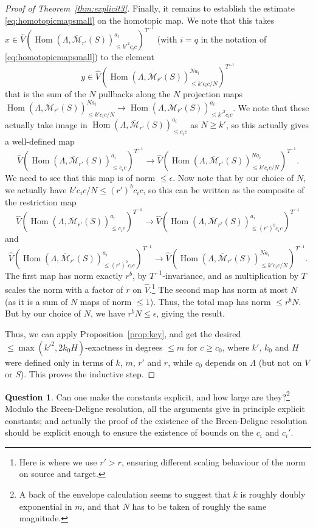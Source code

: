 \documentclass[11pt]{amsart}
\DeclareMathOperator{\Hom}{Hom}
\numberwithin{equation}{section}
\numberwithin{theorem}{section}
\theoremstyle{definition}
\newtheorem{question}[theorem]{Question}
\begin{document}
\begin{proof}[Proof of Theorem~\ref{thm:explicit3}]
Finally, it remains to establish the estimate \eqref{eq:homotopicmapsmall} on the homotopic map. We note that this takes $x\in \widehat{V}(\Hom(\Lambda,\overline{\mathcal M}_{r'}(S))_{\leq k'^2c_ic}^{a_i})^{T^{-1}}$ (with $i=q$ in the notation of \eqref{eq:homotopicmapsmall}) to the element
\[
y\in \widehat{V}(\Hom(\Lambda,\overline{\mathcal M}_{r'}(S))_{\leq k'c_ic/N}^{Na_i})^{T^{-1}}
\]
that is the sum of the $N$ pullbacks along the $N$ projection maps $\Hom(\Lambda,\overline{\mathcal M}_{r'}(S))_{\leq k'c_ic/N}^{Na_i}\to \Hom(\Lambda,\overline{\mathcal M}_{r'}(S))_{\leq k'^2c_ic}^{a_i}$. We note that these actually take image in $\Hom(\Lambda,\overline{\mathcal M}_{r'}(S))_{\leq c_ic}^{a_i}$ as $N\geq k'$, so this actually gives a well-defined map
\[
\widehat{V}(\Hom(\Lambda,\overline{\mathcal M}_{r'}(S))_{\leq c_ic}^{a_i})^{T^{-1}}\to \widehat{V}(\Hom(\Lambda,\overline{\mathcal M}_{r'}(S))_{\leq k'c_ic/N}^{Na_i})^{T^{-1}}.
\]
We need to see that this map is of norm $\leq \epsilon$. Now note that by our choice of $N$, we actually have $k'c_ic/N\leq (r')^b c_ic$, so this can be written as the composite of the restriction map
\[
\widehat{V}(\Hom(\Lambda,\overline{\mathcal M}_{r'}(S))_{\leq c_ic}^{a_i})^{T^{-1}}\to \widehat{V}(\Hom(\Lambda,\overline{\mathcal M}_{r'}(S))_{\leq (r')^b c_ic}^{a_i})^{T^{-1}}
\]
and
\[
\widehat{V}(\Hom(\Lambda,\overline{\mathcal M}_{r'}(S))_{\leq (r')^b c_ic}^{a_i})^{T^{-1}}\to \widehat{V}(\Hom(\Lambda,\overline{\mathcal M}_{r'}(S))_{\leq k'c_ic/N}^{Na_i})^{T^{-1}}.
\]
The first map has norm exactly $r^b$, by $T^{-1}$-invariance, and as multiplication by $T$ scales the norm with a factor of $r$ on $\widehat{V}$.\footnote{Here is where we use $r'>r$, ensuring different scaling behaviour of the norm on source and target.} The second map has norm at most $N$ (as it is a sum of $N$ maps of norm $\leq 1$). Thus, the total map has norm $\leq r^bN$. But by our choice of $N$, we have $r^bN\leq \epsilon$, giving the result.

Thus, we can apply Proposition~\ref{prop:key}, and get the desired $\leq \max(k'^2,2k_0H)$-exactness in degrees $\leq m$ for $c\geq c_0$, where $k'$, $k_0$ and $H$ were defined only in terms of $k$, $m$, $r'$ and $r$, while $c_0$ depends on $\Lambda$ (but not on $V$ or $S$). This proves the inductive step.
\end{proof}

\begin{question} Can one make the constants explicit, and how large are they?\footnote{A back of the envelope calculation seems to suggest that $k$ is roughly doubly exponential in $m$, and that $N$ has to be taken of roughly the same magnitude.} Modulo the Breen-Deligne resolution, all the arguments give in principle explicit constants; and actually the proof of the existence of the Breen-Deligne resolution should be explicit enough to ensure the existence of bounds on the $c_i$ and $c_i'$.
\end{question}
\end{document}
